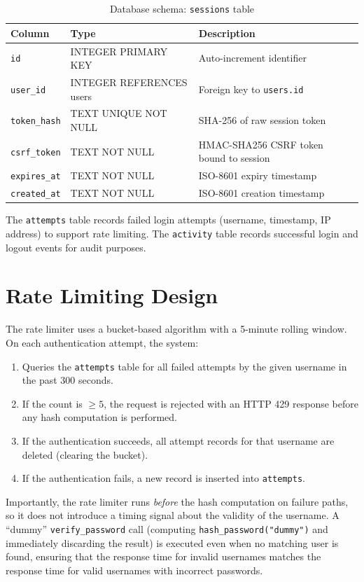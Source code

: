 \begin{table}[H]
\centering
\caption{Database schema: \texttt{sessions} table}
\label{tab:schema_sessions}
\begin{tabularx}{\textwidth}{|l|l|X|}
\hline
\textbf{Column} & \textbf{Type} & \textbf{Description} \\\hline
\texttt{id}            & INTEGER PRIMARY KEY & Auto-increment identifier \\\hline
\texttt{user\_id}      & INTEGER REFERENCES users & Foreign key to \texttt{users.id} \\\hline
\texttt{token\_hash}   & TEXT UNIQUE NOT NULL & SHA-256 of raw session token \\\hline
\texttt{csrf\_token}   & TEXT NOT NULL & HMAC-SHA256 CSRF token bound to session \\\hline
\texttt{expires\_at}   & TEXT NOT NULL & ISO-8601 expiry timestamp \\\hline
\texttt{created\_at}   & TEXT NOT NULL & ISO-8601 creation timestamp \\\hline
\end{tabularx}
\end{table}

\noindent The \texttt{attempts} table records failed login attempts (username, timestamp, IP address) to support rate limiting. The \texttt{activity} table records successful login and logout events for audit purposes.

\section{Rate Limiting Design}
\label{sec:arch_rate_limiting}

The rate limiter uses a bucket-based algorithm with a 5-minute rolling window. On each authentication attempt, the system:

\begin{enumerate}
  \item Queries the \texttt{attempts} table for all failed attempts by the given username in the past 300 seconds.
  \item If the count is $\geq 5$, the request is rejected with an HTTP 429 response before any hash computation is performed.
  \item If the authentication succeeds, all attempt records for that username are deleted (clearing the bucket).
  \item If the authentication fails, a new record is inserted into \texttt{attempts}.
\end{enumerate}

Importantly, the rate limiter runs \emph{before} the hash computation on failure paths, so it does not introduce a timing signal about the validity of the username. A ``dummy'' \texttt{verify\_password} call (computing \texttt{hash\_password("dummy")} and immediately discarding the result) is executed even when no matching user is found, ensuring that the response time for invalid usernames matches the response time for valid usernames with incorrect passwords.
